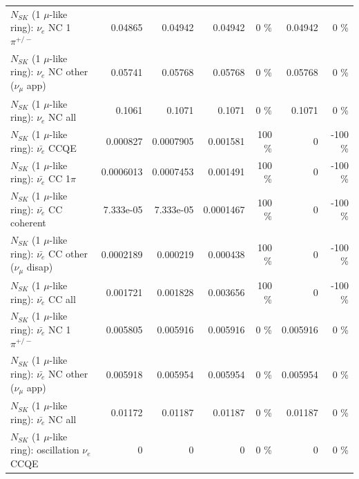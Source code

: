 \begin{table}
\begin{tabular}{| l | r | r | r  r | r  r |}
\hline
                           $N_{SK}$ (1 $\mu$-like ring): $\nu_e$ NC 1$\pi^{+/-}$ &         0.04865 &         0.04942 &         0.04942 &        0 \%  &         0.04942 &        0 \%  \\ 
                  $N_{SK}$ (1 $\mu$-like ring): $\nu_e$ NC other ($\nu_\mu$ app) &         0.05741 &         0.05768 &         0.05768 &        0 \%  &         0.05768 &        0 \%  \\ 
                                  $N_{SK}$ (1 $\mu$-like ring): $\nu_{e}$ NC all &          0.1061 &          0.1071 &          0.1071 &        0 \%  &          0.1071 &        0 \%  \\ 
\hline
\hline
\hline
                                $N_{SK}$ (1 $\mu$-like ring): $\bar{\nu_e}$ CCQE &        0.000827 &       0.0007905 &        0.001581 &      100 \%  &               0 &     -100 \%  \\ 
                           $N_{SK}$ (1 $\mu$-like ring): $\bar{\nu_e}$ CC 1$\pi$ &       0.0006013 &       0.0007453 &        0.001491 &      100 \%  &               0 &     -100 \%  \\ 
                         $N_{SK}$ (1 $\mu$-like ring): $\bar{\nu_e}$ CC coherent &       7.333e-05 &       7.333e-05 &       0.0001467 &      100 \%  &               0 &     -100 \%  \\ 
          $N_{SK}$ (1 $\mu$-like ring): $\bar{\nu_e}$ CC other ($\nu_\mu$ disap) &       0.0002189 &        0.000219 &        0.000438 &      100 \%  &               0 &     -100 \%  \\ 
                            $N_{SK}$ (1 $\mu$-like ring): $\bar{\nu_{e}}$ CC all &        0.001721 &        0.001828 &        0.003656 &      100 \%  &               0 &     -100 \%  \\ 
\hline
                     $N_{SK}$ (1 $\mu$-like ring): $\bar{\nu_e}$ NC 1$\pi^{+/-}$ &        0.005805 &        0.005916 &        0.005916 &        0 \%  &        0.005916 &        0 \%  \\ 
            $N_{SK}$ (1 $\mu$-like ring): $\bar{\nu_e}$ NC other ($\nu_\mu$ app) &        0.005918 &        0.005954 &        0.005954 &        0 \%  &        0.005954 &        0 \%  \\ 
                            $N_{SK}$ (1 $\mu$-like ring): $\bar{\nu_{e}}$ NC all &         0.01172 &         0.01187 &         0.01187 &        0 \%  &         0.01187 &        0 \%  \\ 
\hline
\hline
\hline
                          $N_{SK}$ (1 $\mu$-like ring): oscillation $\nu_e$ CCQE &               0 &               0 &               0 &        0 \%  &               0 &        0 \%  \\ 

\end{tabular}
\end{table}

